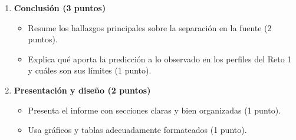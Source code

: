 \documentclass[a4,11pt]{aleph-notas}
\begin{document}
\begin{enumerate}[leftmargin=*, label=\textbf{\arabic*.}]
    \item \textbf{Conclusión (3 puntos)}
    \begin{itemize}[leftmargin=*]
        \item Resume los hallazgos principales sobre la separación en la fuente (2 puntos).
        \item Explica qué aporta la predicción a lo observado en los perfiles del Reto 1 y cuáles son sus límites (1 punto).
    \end{itemize}

    \item \textbf{Presentación y diseño (2 puntos)}
    \begin{itemize}[leftmargin=*]
        \item Presenta el informe con secciones claras y bien organizadas (1 punto).
        \item Usa gráficos y tablas adecuadamente formateados (1 punto).
    \end{itemize}
\end{enumerate}
\end{document}
